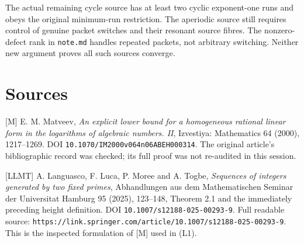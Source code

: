 The actual remaining cycle source has at least two cyclic exponent-one
runs and obeys the original minimum-run restriction. The aperiodic
source still requires control of genuine packet switches and their
resonant source fibres. The nonzero-defect rank in \nolinkurl{note.md}
handles repeated packets, not arbitrary switching. Neither new argument
proves all such sources converge.

\section{Sources}

{[}M{]} E. M. Matveev, \emph{An explicit lower bound for a homogeneous
rational linear form in the logarithms of algebraic numbers. II},
Izvestiya: Mathematics 64 (2000), 1217--1269. DOI
\nolinkurl{10.1070/IM2000v064n06ABEH000314}. The original article's
bibliographic record was checked; its full proof was not re-audited in
this session.

{[}LLMT{]} A. Languasco, F. Luca, P. Moree and A. Togbe, \emph{Sequences
of integers generated by two fixed primes}, Abhandlungen aus dem
Mathematischen Seminar der Universitat Hamburg 95 (2025), 123--148,
Theorem 2.1 and the immediately preceding height definition. DOI
\nolinkurl{10.1007/s12188-025-00293-9}. Full readable source:
\nolinkurl{https://link.springer.com/article/10.1007/s12188-025-00293-9}.
This is the inspected formulation of {[}M{]} used in (L1).
